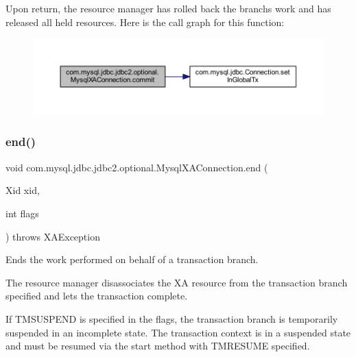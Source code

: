 Upon return, the resource manager has rolled back the branch\textquotesingle{}s work and has released all held resources. Here is the call graph for this function\+:
\nopagebreak
\begin{figure}[H]
\begin{center}
\leavevmode
\includegraphics[width=350pt]{classcom_1_1mysql_1_1jdbc_1_1jdbc2_1_1optional_1_1_mysql_x_a_connection_a0e248ebae4b509b14237febcd79c7132_cgraph}
\end{center}
\end{figure}
\mbox{\label{classcom_1_1mysql_1_1jdbc_1_1jdbc2_1_1optional_1_1_mysql_x_a_connection_ad446fd4ef97424ed837f11269a6da6f6}} 
\subsubsection{\texorpdfstring{end()}{end()}}
{\footnotesize\ttfamily void com.\+mysql.\+jdbc.\+jdbc2.\+optional.\+Mysql\+X\+A\+Connection.\+end (\begin{DoxyParamCaption}\item[{Xid}]{xid,  }\item[{int}]{flags }\end{DoxyParamCaption}) throws X\+A\+Exception}

Ends the work performed on behalf of a transaction branch.

The resource manager disassociates the XA resource from the transaction branch specified and lets the transaction complete.

If T\+M\+S\+U\+S\+P\+E\+ND is specified in the flags, the transaction branch is temporarily suspended in an incomplete state. The transaction context is in a suspended state and must be resumed via the start method with T\+M\+R\+E\+S\+U\+ME specified.

